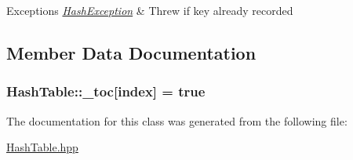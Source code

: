 \begin{DoxyExceptions}{\-Exceptions}
{\em \hyperlink{class_hash_exception}{\-Hash\-Exception}} & \-Threw if key already recorded \\
\hline
\end{DoxyExceptions}


\subsection{\-Member \-Data \-Documentation}
\hypertarget{class_hash_table_a9113f13baf875cb9c461c09808983978}{
\subsubsection[{\-\_\-toc}]{\setlength{\rightskip}{0pt plus 5cm}\-Hash\-Table\-::\-\_\-toc\mbox{[}index\mbox{]} = true}}\label{class_hash_table_a9113f13baf875cb9c461c09808983978}


\-The documentation for this class was generated from the following file\-:\begin{DoxyCompactItemize}
\item 
\hyperlink{_hash_table_8hpp}{\-Hash\-Table.\-hpp}\end{DoxyCompactItemize}
